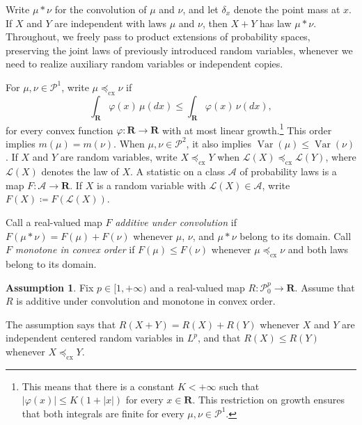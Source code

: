 \documentclass[11pt]{amsart}
\theoremstyle{plain}
\theoremstyle{definition}
\newtheorem{assumption}{Assumption}
\theoremstyle{remark}
\numberwithin{equation}{section}
\newcommand{\1}{\mathbf 1}
\begin{document}
Write \(\mu*\nu\) for the convolution of \(\mu\) and \(\nu\), and let \(\delta_x\) denote the point mass at \(x\). If \(X\) and \(Y\) are independent with laws \(\mu\) and \(\nu\), then \(X+Y\) has law \(\mu*\nu\). Throughout, we freely pass to product extensions of probability spaces, preserving the joint laws of previously introduced random variables, whenever we need to realize auxiliary random variables or independent copies.

For \(\mu,\nu\in\mathcal P^1\), write \(\mu\preceq_{\mathrm{cx}}\nu\) if
\[
\int_{\mathbf R}\varphi(x)\,\mu(dx)\leq\int_{\mathbf R}\varphi(x)\,\nu(dx),
\]
for every convex function \(\varphi\colon\mathbf R\to\mathbf R\) with at most linear growth.\footnote{This means that there is a constant \(K<+\infty\) such that \(|\varphi(x)|\leq K(1+|x|)\) for every \(x\in\mathbf R\). This restriction on growth ensures that both integrals are finite for every \(\mu,\nu\in\mathcal P^1\).} This order implies \(m(\mu)=m(\nu)\). When \(\mu,\nu\in\mathcal P^2\), it also implies \(\operatorname{Var}(\mu)\leq\operatorname{Var}(\nu)\). If \(X\) and \(Y\) are random variables, write \(X\preceq_{\mathrm{cx}}Y\) when \(\mathcal L(X)\preceq_{\mathrm{cx}}\mathcal L(Y)\), where \(\mathcal L(X)\) denotes the law of \(X\). A statistic on a class \(\mathcal A\) of probability laws is a map \(F\colon\mathcal A\to\mathbf R\). If \(X\) is a random variable with \(\mathcal L(X)\in\mathcal A\), write \(F(X)\coloneqq F(\mathcal L(X))\).

Call a real-valued map \(F\) \textit{additive under convolution} if \(F(\mu*\nu)=F(\mu)+F(\nu)\) whenever \(\mu\), \(\nu\), and \(\mu*\nu\) belong to its domain. Call \(F\) \textit{monotone in convex order} if \(F(\mu)\leq F(\nu)\) whenever \(\mu\preceq_{\mathrm{cx}}\nu\) and both laws belong to its domain.
\begin{assumption}\label{ass:additive-convex-order}
Fix \(p\in[1,+\infty)\) and a real-valued map \(R\colon\mathcal P_0^p\to\mathbf R\). Assume that \(R\) is additive under convolution and monotone in convex order.
\end{assumption}
The assumption says that \(R(X+Y)=R(X)+R(Y)\) whenever \(X\) and \(Y\) are independent centered random variables in \(L^p\), and that \(R(X)\leq R(Y)\) whenever \(X\preceq_{\mathrm{cx}}Y\).
\end{document}
